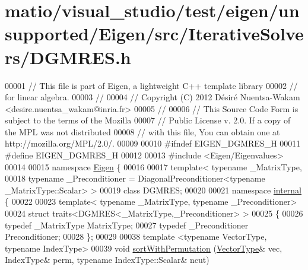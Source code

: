 \hypertarget{matio_2visual__studio_2test_2eigen_2unsupported_2_eigen_2src_2_iterative_solvers_2_d_g_m_r_e_s_8h_source}{}\section{matio/visual\+\_\+studio/test/eigen/unsupported/\+Eigen/src/\+Iterative\+Solvers/\+D\+G\+M\+R\+ES.h}
\label{matio_2visual__studio_2test_2eigen_2unsupported_2_eigen_2src_2_iterative_solvers_2_d_g_m_r_e_s_8h_source}

\begin{DoxyCode}
00001 \textcolor{comment}{// This file is part of Eigen, a lightweight C++ template library}
00002 \textcolor{comment}{// for linear algebra.}
00003 \textcolor{comment}{//}
00004 \textcolor{comment}{// Copyright (C) 2012 Désiré Nuentsa-Wakam <desire.nuentsa\_wakam@inria.fr>}
00005 \textcolor{comment}{//}
00006 \textcolor{comment}{// This Source Code Form is subject to the terms of the Mozilla}
00007 \textcolor{comment}{// Public License v. 2.0. If a copy of the MPL was not distributed}
00008 \textcolor{comment}{// with this file, You can obtain one at http://mozilla.org/MPL/2.0/.}
00009 
00010 \textcolor{preprocessor}{#ifndef EIGEN\_DGMRES\_H}
00011 \textcolor{preprocessor}{#define EIGEN\_DGMRES\_H}
00012 
00013 \textcolor{preprocessor}{#include <Eigen/Eigenvalues>}
00014 
00015 \textcolor{keyword}{namespace }\hyperlink{namespace_eigen}{Eigen} \{ 
00016   
00017 \textcolor{keyword}{template}< \textcolor{keyword}{typename} \_MatrixType,
00018           \textcolor{keyword}{typename} \_Preconditioner = DiagonalPreconditioner<typename \_MatrixType::Scalar> >
00019 \textcolor{keyword}{class }DGMRES;
00020 
00021 \textcolor{keyword}{namespace }\hyperlink{namespaceinternal}{internal} \{
00022 
00023 \textcolor{keyword}{template}< \textcolor{keyword}{typename} \_MatrixType, \textcolor{keyword}{typename} \_Preconditioner>
00024 \textcolor{keyword}{struct }traits<DGMRES<\_MatrixType,\_Preconditioner> >
00025 \{
00026   \textcolor{keyword}{typedef} \_MatrixType MatrixType;
00027   \textcolor{keyword}{typedef} \_Preconditioner Preconditioner;
00028 \};
00029 
00038 \textcolor{keyword}{template} <\textcolor{keyword}{typename} VectorType, \textcolor{keyword}{typename} IndexType>
00039 \textcolor{keywordtype}{void} \hyperlink{namespace_eigen_1_1internal_afe2a11c61eff70f7f68681a557fa21e7}{sortWithPermutation} (\hyperlink{struct_vector_type}{VectorType}& vec, IndexType& perm, \textcolor{keyword}{typename} 
      IndexType::Scalar& ncut)

\end{DoxyCode}
